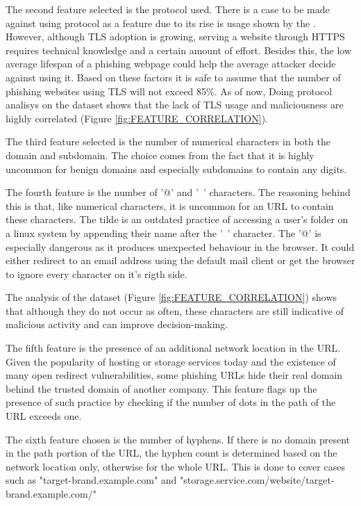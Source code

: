 The second feature selected is the protocol used. There is a case to be made against using protocol as a feature due to its rise is usage shown by the \cite{APWG_Q42019}. However, although TLS adoption is growing, serving a website through HTTPS requires technical knowledge and a certain amount of effort. Besides this, the low average lifespan of a phishing webpage could help the average attacker decide against using it. Based on these factors it is safe to assume that the number of phishing websites using TLS will not exceed 85\%. As of now, Doing protocol analisys on the dataset shows that the lack of TLS usage and maliciousness are highly correlated (Figure \ref{fig:FEATURE_CORRELATION}).

The third feature selected is the number of numerical characters in both the domain and subdomain. The choice comes from the fact that it is highly uncommon for benign domains and especially subdomains to contain any digits.

The fourth feature is the number of '@' and '~' characters. The reasoning behind this is that, like numerical characters, it is uncommon for an URL to contain these characters. The tilde is an outdated practice of accessing a user's folder on a linux system by appending their name after the '~' character.
The '@' is especially dangerous as it produces unexpected behaviour in the browser. It could either redirect to an email address using the default mail client or get the browser to ignore every character on it's rigth side.

The analysis of the dataset (Figure \ref{fig:FEATURE_CORRELATION}) shows that although they do not occur as often, these characters are still indicative of malicious activity and can improve decision-making.

The fifth feature is the presence of an additional network location in the URL. Given the popularity of hosting or storage services today and the existence of many open redirect vulnerabilities, some phishing URLs hide their real domain behind the trusted domain of another company. This feature flags up the presence of such practice by checking if the number of dots in the path of the URL exceeds one.

The sixth feature chosen is the number of hyphens. If there is no domain present in the path portion of the URL, the hyphen count is determined based on the network location only, otherwise for the whole URL. This is done to cover cases such as "target-brand.example.com" and "storage.service.com/website/target-brand.example.com/"

